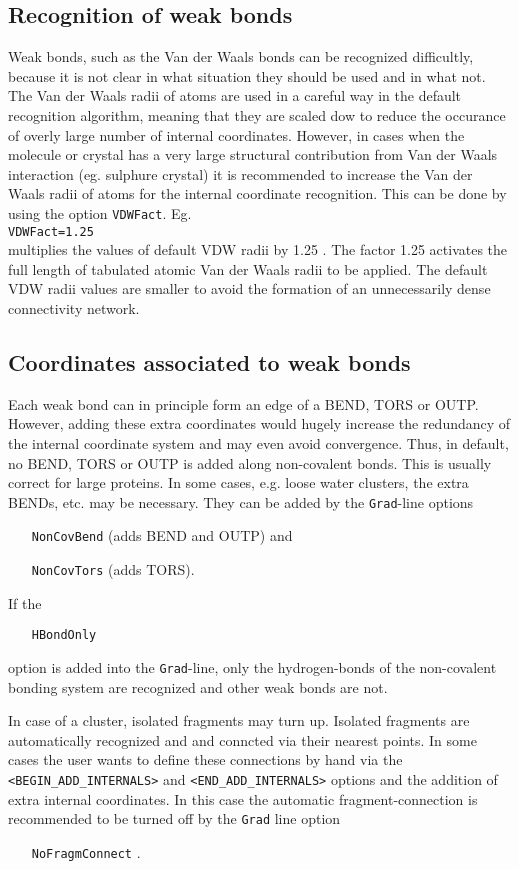 \documentclass[prl,aps,preprint,superbib,12pt]{revtex4}
\begin{document}
\subsection{Recognition of weak bonds}
Weak bonds, such as the Van der Waals bonds can be recognized difficultly,
because it is not clear in what situation they should be used and in what 
not.
The Van der Waals radii of atoms are used in a careful way in the default 
recognition algorithm, meaning that they are scaled dow to reduce the occurance
of overly large number of internal coordinates.
However, in cases when the molecule or crystal has a very large structural
contribution from Van der Waals interaction (eg. sulphure crystal) it is recommended to increase the Van der Waals radii of atoms for the internal coordinate 
recognition. This can be done by using the option {\tt VDWFact}.
Eg. 
\\
{\tt VDWFact=1.25}
\\ 
multiplies the values of default VDW radii by 1.25 . The factor 1.25 activates 
the full length of tabulated atomic Van der Waals radii to be applied.
The default VDW radii values are smaller to avoid the formation of an unnecessarily dense connectivity network.

\subsection{Coordinates associated to weak bonds}
Each weak bond can in principle form an edge of a BEND, TORS or OUTP.
However, adding these extra coordinates would hugely increase the 
redundancy of the internal coordinate system and may even avoid
convergence. Thus, in default, no BEND, TORS or OUTP is added along
non-covalent bonds. This is usually correct for large proteins.
In some cases, e.g. loose water clusters, the extra BENDs, etc. may be 
necessary. They can be added by the {\tt Grad}-line options
\begin{itemize}
\item[{\tt NonCovBend}] (adds BEND and OUTP) and
\item[{\tt NonCovTors}] (adds TORS).
\end{itemize}
If the 
\begin{itemize}
\item[{\tt HBondOnly}] 
\end{itemize}
option is added into the {\tt Grad}-line, only the hydrogen-bonds
of the non-covalent bonding system are recognized and other weak bonds
are not.

In case of a cluster, isolated fragments may turn up. Isolated
fragments are automatically recognized and and conncted via their 
nearest points. In some cases the user wants to define these connections
by hand via the {\tt <BEGIN\_ADD\_INTERNALS>} and 
{\tt <END\_ADD\_INTERNALS>} options and the addition of extra 
internal coordinates. In this case the automatic fragment-connection 
is recommended to be turned off by the {\tt Grad} line option
\begin{itemize}
\item[{\tt NoFragmConnect}] .
\end{itemize}
\end{document}

